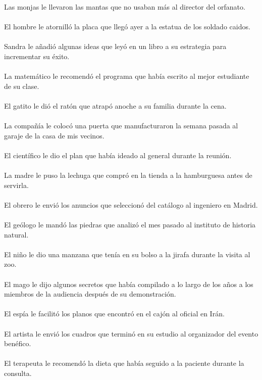 Las monjas le llevaron las mantas que no usaban más al director del orfanato.	\\	\\
El hombre le atornilló la placa que llegó ayer a la estatua de los soldado caidos.	\\	\\
Sandra le añadió algunas ideas que leyó en un libro a su estrategia para incrementar su éxito.	\\	\\
La matemático le recomendó el programa que había escrito al mejor estudiante de su clase.	\\	\\
El gatito le dió el ratón que atrapó anoche a su familia durante la cena.	\\	\\
La compañía le colocó una puerta que manufacturaron la semana pasada al garaje de la casa de mis vecinos.	\\	\\
El científico le dio el plan que había ideado al general durante la reunión.	\\	\\
La madre le puso la lechuga que compró en la tienda a la hamburguesa antes de servirla.	\\	\\
El obrero le envió los anuncios que seleccionó del catálogo al ingeniero en Madrid.	\\	\\
El geólogo le mandó las piedras que analizó el mes pasado al instituto de historia natural.	\\	\\
El niño le dio una manzana que tenía en su bolso a la jirafa durante la visita al zoo.	\\	\\
El mago le dijo algunos secretos que había compilado a lo largo de los años a los miembros de la audiencia después de su demonstración.	\\	\\
El espía le facilitó los planos que encontró en el cajón al oficial en Irán.	\\	\\
El artista le envió los cuadros que terminó en su estudio al organizador del evento benéfico.	\\	\\
El terapeuta le recomendó la dieta que había seguido a la paciente durante la consulta.	\\	\\
